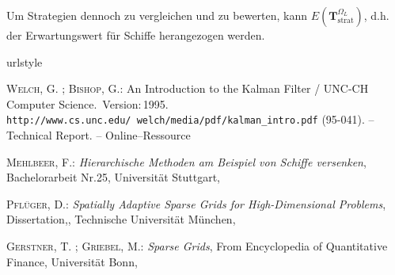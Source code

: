 \documentclass[a4paper,12pt]{llncs}
\numberwithin{equation}{section}
\DeclareMathOperator{\strat}{strat}
\begin{document}
Um Strategien dennoch zu vergleichen und zu bewerten, kann $E(\mathbf{T}^{\Omega_L}_{\strat})$, d.h. der Erwartungswert für Schiffe herangezogen werden.



\newpage

% 

\begin{thebibliography}{WB95}
	\providecommand{\url}[1]{\texttt{#1}}
	\expandafter\ifx\csname urlstyle\endcsname\relax
	\providecommand{\doi}[1]{doi: #1}\else
	\providecommand{\doi}{doi: \begingroup \urlstyle{rm}\Url}\fi
	
	\textsc{Welch}, G. ; \textsc{Bishop}, G.:
	\newblock An Introduction to the Kalman Filter  / UNC-CH Computer Science.
	\newblock \,Version:\,1995.
	\newblock  \url{http://www.cs.unc.edu/~welch/media/pdf/kalman_intro.pdf}
	(95-041). --
	\newblock Technical Report. --
	\newblock Online--Ressource
	
	\textsc{Mehlbeer}, F.:
	\newblock \textit{Hierarchische Methoden am Beispiel von Schiffe versenken},
	\newblock Bachelorarbeit Nr.25,
	\newblock Universität Stuttgart,
	
	\textsc{Pflüger}, D.:
	\newblock \textit{Spatially Adaptive Sparse Grids for High-Dimensional Problems},
	\newblock Dissertation,,
	\newblock Technische Universität München,
	
	\textsc{Gerstner}, T. ; \textsc{Griebel}, M.:
	\newblock \textit{Sparse Grids},
	\newblock From Encyclopedia of Quantitative Finance,
	\newblock Universität Bonn,
	
\end{thebibliography}


\end{document}
